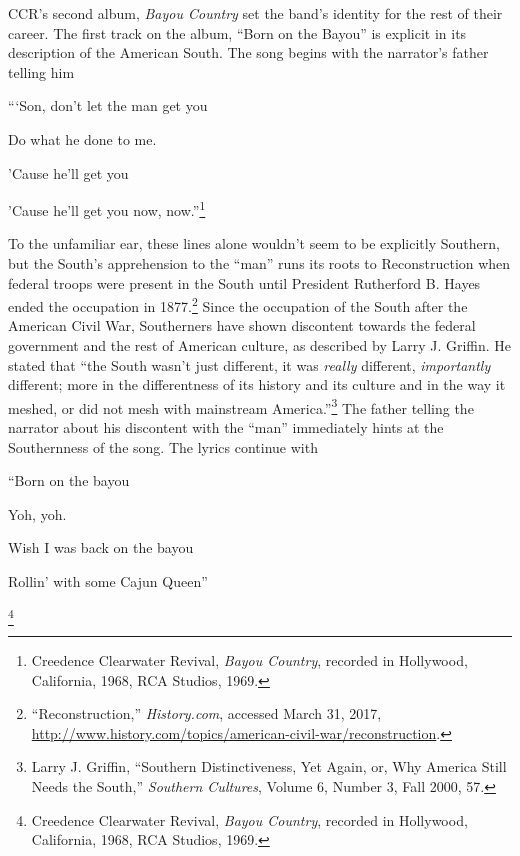 \documentclass[10pt]{article}
\begin{document}
CCR's second album, \textit{Bayou Country} set the band's identity for the rest of their career. The first track on the album, ``Born on the Bayou'' is explicit in its description of the American South. The song begins with the narrator's father telling him 

\singlespacing
{\small```Son, don't let the man get you

Do what he done to me.

'Cause he'll get you

'Cause he'll get you now, now.''\footnote{Creedence Clearwater Revival, \textit{Bayou Country}, recorded in Hollywood, California, 1968, RCA Studios, 1969.}}

\doublespacing
\noindent To the unfamiliar ear, these lines alone wouldn't seem to be explicitly Southern, but the South's apprehension to the ``man'' runs its roots to Reconstruction when federal troops were present in the South until President Rutherford B. Hayes ended the occupation in 1877.\footnote{``Reconstruction,'' \textit{History.com}, accessed March 31, 2017, \url{http://www.history.com/topics/american-civil-war/reconstruction}.} Since the occupation of the South after the American Civil War, Southerners have shown discontent towards the federal government and the rest of American culture, as described by Larry J. Griffin. He stated that ``the South wasn't just different, it was \textit{really} different, \textit{importantly} different; more in the differentness of its history and its culture and in the way it meshed, or did not mesh with mainstream America.''\footnote{Larry J. Griffin, ``Southern Distinctiveness, Yet Again, or, Why America Still Needs the South,'' \textit{Southern Cultures}, Volume 6, Number 3, Fall 2000, 57.} The father telling the narrator about his discontent with the ``man'' immediately hints at the Southernness of the song. The lyrics continue with

\singlespacing
{\small ``Born on the bayou

Yoh, yoh.

Wish I was back on the bayou

Rollin' with some Cajun Queen''}\footnote{Creedence Clearwater Revival, \textit{Bayou Country}, recorded in Hollywood, California, 1968, RCA Studios, 1969.}
\end{document}
